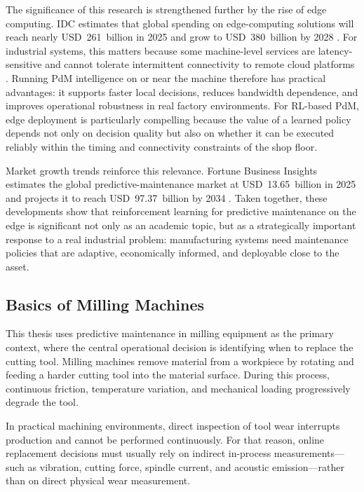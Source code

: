 \documentclass[12pt,oneside]{book}
\begin{document}
The significance of this research is strengthened further by the rise of edge computing. IDC estimates that global spending on edge-computing solutions will reach nearly USD~261~billion in 2025 and grow to USD~380~billion by 2028 \citep{IDC2025Edge}. For industrial systems, this matters because some machine-level services are latency-sensitive and cannot tolerate intermittent connectivity to remote cloud platforms \citep{AWSIndustrialEdge,CiscoEdge}. Running PdM intelligence on or near the machine therefore has practical advantages: it supports faster local decisions, reduces bandwidth dependence, and improves operational robustness in real factory environments. For RL-based PdM, edge deployment is particularly compelling because the value of a learned policy depends not only on decision quality but also on whether it can be executed reliably within the timing and connectivity constraints of the shop floor.

Market growth trends reinforce this relevance. Fortune Business Insights estimates the global predictive-maintenance market at USD~13.65~billion in 2025 and projects it to reach USD~97.37~billion by 2034 \citep{FortunePdM2026}. Taken together, these developments show that reinforcement learning for predictive maintenance on the edge is significant not only as an academic topic, but as a strategically important response to a real industrial problem: manufacturing systems need maintenance policies that are adaptive, economically informed, and deployable close to the asset.

\subsection{Basics of Milling Machines}
This thesis uses predictive maintenance in milling equipment as the primary context, where the central operational decision is identifying when to replace the cutting tool. Milling machines remove material from a workpiece by rotating and feeding a harder cutting tool into the material surface. During this process, continuous friction, temperature variation, and mechanical loading progressively degrade the tool.

In practical machining environments, direct inspection of tool wear interrupts production and cannot be performed continuously. For that reason, online replacement decisions must usually rely on indirect in-process measurements---such as vibration, cutting force, spindle current, and acoustic emission---rather than on direct physical wear measurement.
\end{document}
